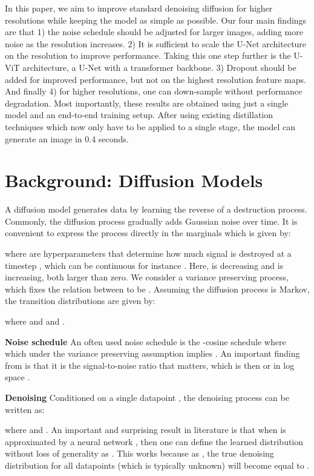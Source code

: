 \documentclass[nohyperref]{article}
\theoremstyle{plain}
\theoremstyle{definition}
\theoremstyle{remark}
\begin{document}
In this paper, we aim to improve standard denoising diffusion for higher resolutions while keeping the model as simple as possible. Our four main findings are that 1) the noise schedule should be adjusted for larger images,  adding more noise as the resolution increases. 2) It is sufficient to scale the U-Net architecture on the  resolution to improve performance. Taking this one step further is the U-ViT architecture, a U-Net with a transformer backbone. 3) Dropout should be added for improved performance, but not on the highest resolution feature maps. And finally 4) for higher resolutions, one can down-sample without performance degradation. 
Most importantly, these results are obtained using just a single model and an end-to-end training setup. After using existing distillation techniques which now only have to be applied to a single stage, the model can generate an image in 0.4 seconds.
 
\section{Background: Diffusion Models}
\label{sec:background}

A diffusion model generates data by learning the reverse of a destruction process. Commonly, the diffusion process gradually adds Gaussian noise over time. It is convenient to express the process directly in the marginals  which is given by:

where  are hyperparameters that determine how much signal is destroyed at a timestep , which can be continuous for instance . Here,  is decreasing and  is increasing, both larger than zero. We consider a variance preserving process, which fixes the relation between  to be . Assuming the diffusion process is Markov, the transition distributions are given by:

where  and  and .

\textbf{Noise schedule}
An often used noise schedule is the -cosine schedule where  which under the variance preserving assumption implies . An important finding from \citep{kingma2021vdm} is that it is the signal-to-noise ratio  that matters, which is then  or in log space . 


\textbf{Denoising}
Conditioned on a single datapoint , the denoising process can be written as:

where  and . An important and surprising result in literature is that when  is approximated by a neural network , then one can define the learned distribution  without loss of generality as . This works because as , the true denoising distribution for all datapoints  (which is typically unknown) will become equal to  \citep{song2021scorebasedsde}.
\end{document}
